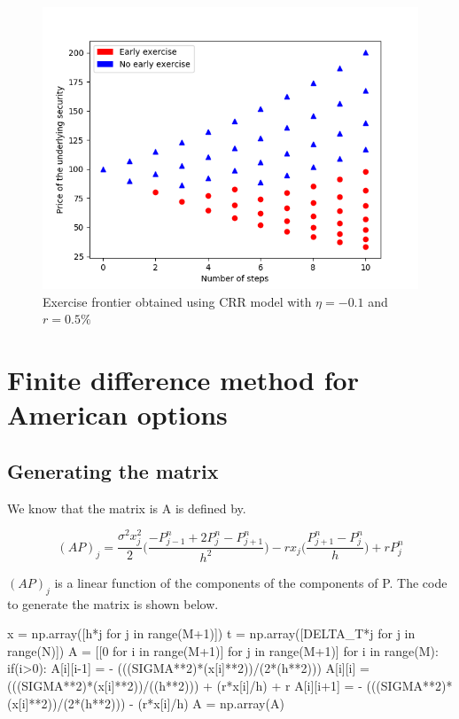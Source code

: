 \documentclass[12pt]{report}
\begin{document}
\begin{figure}[H]
	\centering
	\includegraphics[scale=0.6]{plots/CRRdrift}
	\caption{Exercise frontier obtained using CRR model with $\eta=-0.1$ and $r=0.5\%$}
\end{figure}

\chapter*{Finite difference method for American options}

\section*{Generating the matrix}
We know that the matrix is A is defined by.

\begin{equation*}
	(AP)_j=\frac{\sigma^2x_j^2}{2}\bigg(\frac{-P^n_{j-1}+2P^n_{j}-P^n_{j+1}}{h^2}\bigg)-rx_j\bigg(\frac{P^n_{j+1}-P^n_{j}}{h}\bigg)+rP^n_{j}
\end{equation*}

$(AP)_j$ is a linear function of the components of the components of P. The code to generate the matrix is shown below.
\\
\begin{python}
	x = np.array([h*j for j in range(M+1)])
	t = np.array([DELTA_T*j for j in range(N)])
	A = [[0 for i in range(M+1)] for j in range(M+1)]
	for i in range(M):
 	 if(i>0):
	  A[i][i-1] = - (((SIGMA**2)*(x[i]**2))/(2*(h**2))) 
	  A[i][i] =  (((SIGMA**2)*(x[i]**2))/((h**2))) + (r*x[i]/h) + r
	  A[i][i+1] = - (((SIGMA**2)*(x[i]**2))/(2*(h**2))) - (r*x[i]/h)
	A = np.array(A)
\end{python}
\end{document}
